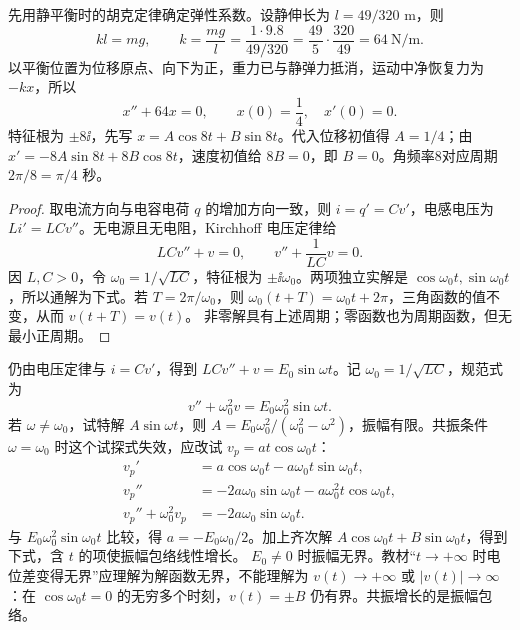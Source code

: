 先用静平衡时的胡克定律确定弹性系数。设静伸长为 $l=49/320$ m，则
\[
kl=mg,\qquad k=\dfrac{mg}{l}
=\dfrac{1\cdot9.8}{49/320}=\dfrac{49}{5}\cdot\dfrac{320}{49}=64\ \mathrm{N/m}.
\]
以平衡位置为位移原点、向下为正，重力已与静弹力抵消，运动中净恢复力为 $-kx$，所以
\[
x''+64x=0,\qquad x(0)=\dfrac14,\quad x'(0)=0.
\]
特征根为 $\pm8\ii$，先写 $x=A\cos8t+B\sin8t$。代入位移初值得 $A=1/4$；由 $x'=-8A\sin8t+8B\cos8t$，速度初值给 $8B=0$，即 $B=0$。角频率8对应周期 $2\pi/8=\pi/4$ 秒。
\begin{proof}
取电流方向与电容电荷 $q$ 的增加方向一致，则 $i=q'=Cv'$，电感电压为 $Li'=LCv''$。无电源且无电阻，Kirchhoff 电压定律给
\[
LCv''+v=0,\qquad v''+\dfrac1{LC}v=0.
\]
因 $L,C>0$，令 $\omega_0=1/\sqrt{LC}$，特征根为 $\pm\ii\omega_0$。两项独立实解是 $\cos\omega_0t,\sin\omega_0t$，所以通解为下式。若 $T=2\pi/\omega_0$，则 $\omega_0(t+T)=\omega_0t+2\pi$，三角函数的值不变，从而 $v(t+T)=v(t)$。
非零解具有上述周期；零函数也为周期函数，但无最小正周期。
\end{proof}
仍由电压定律与 $i=Cv'$，得到 $LCv''+v=E_0\sin\omega t$。记 $\omega_0=1/\sqrt{LC}$，规范式为
\[
v''+\omega_0^2v=E_0\omega_0^2\sin\omega t.
\]
若 $\omega\ne\omega_0$，试特解 $A\sin\omega t$，则 $A=E_0\omega_0^2/(\omega_0^2-\omega^2)$，振幅有限。共振条件 $\omega=\omega_0$ 时这个试探式失效，应改试 $v_p=at\cos\omega_0t$：
\[
\begin{aligned}
v_p'&=a\cos\omega_0t-a\omega_0t\sin\omega_0t,\\
v_p''&=-2a\omega_0\sin\omega_0t-a\omega_0^2t\cos\omega_0t,\\
v_p''+\omega_0^2v_p&=-2a\omega_0\sin\omega_0t.
\end{aligned}
\]
与 $E_0\omega_0^2\sin\omega_0t$ 比较，得 $a=-E_0\omega_0/2$。加上齐次解 $A\cos\omega_0t+B\sin\omega_0t$，得到下式，含 $t$ 的项使振幅包络线性增长。
$E_0\ne0$ 时振幅无界。教材“$t\to+\infty$ 时电位差变得无界”应理解为解函数无界，不能理解为 $v(t)\to+\infty$ 或 $|v(t)|\to\infty$：在 $\cos\omega_0t=0$ 的无穷多个时刻，$v(t)=\pm B$ 仍有界。共振增长的是振幅包络。
